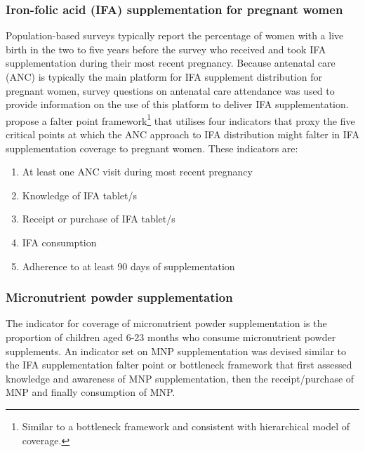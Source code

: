 \documentclass[12pt,a4paper]{article}
\let\rmarkdownfootnote\footnote%
\def\footnote{\protect\rmarkdownfootnote}
\begin{document}
\hypertarget{iron-folic-acid-ifa-supplementation-for-pregnant-women}{%
\subsubsection{Iron-folic acid (IFA) supplementation for pregnant women}\label{iron-folic-acid-ifa-supplementation-for-pregnant-women}}

Population-based surveys typically report the percentage of women with a live birth in the two to five years before the survey who received and took IFA supplementation during their most recent pregnancy. Because antenatal care (ANC) is typically the main platform for IFA supplement distribution for pregnant women, survey questions on antenatal care attendance was used to provide information on the use of this platform to deliver IFA supplementation. \citet{Sununtnasuk:2015kb} propose a falter point framework\footnote{Similar to a bottleneck framework and consistent with \citet{Tanahashi:1978we} hierarchical model of coverage.} that utilises four indicators that proxy the five critical points at which the ANC approach to IFA distribution might falter in IFA supplementation coverage to pregnant women. These indicators are:

\begin{enumerate}
\def\labelenumi{\arabic{enumi}.}
\item
  At least one ANC visit during most recent pregnancy
\item
  Knowledge of IFA tablet/s
\item
  Receipt or purchase of IFA tablet/s
\item
  IFA consumption
\item
  Adherence to at least 90 days of supplementation
\end{enumerate}

\hypertarget{micronutrient-powder-supplementation}{%
\subsubsection{Micronutrient powder supplementation}\label{micronutrient-powder-supplementation}}

The indicator for coverage of micronutrient powder supplementation is the proportion of children aged 6-23 months who consume micronutrient powder supplements. An indicator set on MNP supplementation was devised similar to the IFA supplementation falter point or bottleneck framework that first assessed knowledge and awareness of MNP supplementation, then the receipt/purchase of MNP and finally consumption of MNP.
\end{document}
